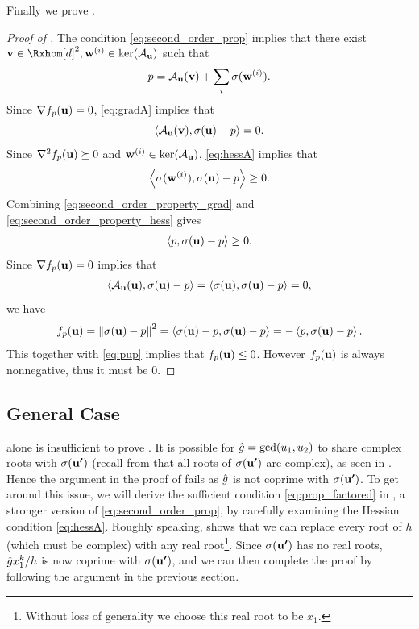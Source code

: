 \documentclass[final,onefignum,onetabnum]{siamart220329}
\begin{document}
Finally we prove .
\begin{proof}[Proof of ]
  The condition \eqref{eq:second_order_prop} implies that there exist
  $\vecp{v} \in \Rxhom[d]^2, \vecp{w}^{(i)} \in \ker(\Aup)$ such that
  \begin{align*}
    p = \mathcal{A}_{\boldsymbol{\mathbf{u}}}(\boldsymbol{\mathbf{v}}) + \sum_i \sigma(\boldsymbol{\mathbf{w}}^{(i)}).
  \end{align*}
  Since $\nabla f_p(\boldsymbol{\mathbf{u}}) = 0$,
  \eqref{eq:gradA} implies that
  \begin{equation}
    \label{eq:second_order_property_grad}
    \left\langle \mathcal{A}_{\boldsymbol{\mathbf{u}}}(\boldsymbol{\mathbf{v}}), \sigma(\boldsymbol{\mathbf{u}}) - p \right\rangle = 0.
  \end{equation}
  Since $\nabla^2 f_p(\boldsymbol{\mathbf{u}}) \succeq 0$ and $\boldsymbol{\mathbf{w}}^{(i)} \in \ker(\mathcal{A}_{\boldsymbol{\mathbf{u}}})$,
  \eqref{eq:hessA} implies that
  \begin{equation}
    \label{eq:second_order_property_hess}
    \left\langle \sigma(\boldsymbol{\mathbf{w}}^{(i)}), \sigma(\boldsymbol{\mathbf{u}}) - p \right\rangle \ge 0.
  \end{equation}
  Combining \eqref{eq:second_order_property_grad} and \eqref{eq:second_order_property_hess} gives
  \begin{align} \label{eq:pup}
    \left\langle p, \sigma(\boldsymbol{\mathbf{u}}) - p \right\rangle \ge 0.
  \end{align}
  Since $\nabla f_p(\boldsymbol{\mathbf{u}}) = 0$ implies that
  \begin{align*}
    \left\langle \mathcal{A}_{\boldsymbol{\mathbf{u}}}(\boldsymbol{\mathbf{u}}), \sigma(\boldsymbol{\mathbf{u}}) - p \right\rangle =
    \left\langle \sigma(\boldsymbol{\mathbf{u}}), \sigma(\boldsymbol{\mathbf{u}}) - p \right\rangle = 0,
  \end{align*}
  we have
  \begin{align*}
    f_p(\boldsymbol{\mathbf{u}}) = \left\lVert \sigma(\boldsymbol{\mathbf{u}}) - p \right\lVert^2
    = \left\langle \sigma(\boldsymbol{\mathbf{u}}) - p, \sigma(\boldsymbol{\mathbf{u}}) - p \right\rangle
    = - \left\langle p, \sigma(\boldsymbol{\mathbf{u}}) - p \right\rangle.
  \end{align*}
  This together with \eqref{eq:pup} implies that $f_p(\boldsymbol{\mathbf{u}}) \le
  0$. However $f_p(\boldsymbol{\mathbf{u}})$ is always nonnegative, thus it must be 0.
\end{proof}

\subsection{General Case}
\label{sec:general-proof}
 alone is insufficient to prove . It is
possible for $\hat{g} = \gcd(u_1, u_2)$ to share complex roots with $\sigma(\boldsymbol{\mathbf{u'}})$
(recall from  that all roots of $\sigma(\boldsymbol{\mathbf{u'}})$ are
complex), as seen in . Hence the argument in the proof of
 fails as $\hat{g}$ is not coprime with
$\sigma(\boldsymbol{\mathbf{u'}})$. To get around this issue, we will derive the sufficient
condition \eqref{eq:prop_factored} in ,
a stronger version of \eqref{eq:second_order_prop}, by carefully examining the
Hessian condition \eqref{eq:hessA}. Roughly speaking,
 shows that we can replace every root of
$h$ (which must be complex) with any real root\footnote{Without loss of
  generality we choose this real root to be $x_1$.}. Since $\sigma(\boldsymbol{\mathbf{u'}})$ has
no real roots, $\hat{g} x_1^k/h$ is now coprime with $\sigma(\boldsymbol{\mathbf{u'}})$, and we can
then complete the proof by following the argument in the previous section.
\end{document}
